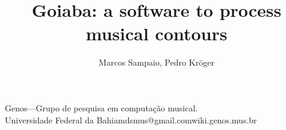 \documentclass[12pt]{article}
\begin{document}
\title{Goiaba: a software to process musical contours}

\author{Marcos Sampaio, Pedro Kröger}{Genos---Grupo de pesquisa em
  computação musical.\\Universidade Federal da Bahia}{mdsmus@gmail.com}{wiki.genos.mus.br}

\begin{sumario}
  
\end{sumario}



\begin{Abstract}
  
\end{Abstract}


\onehalfspacing



\singlespacing


\end{document}
